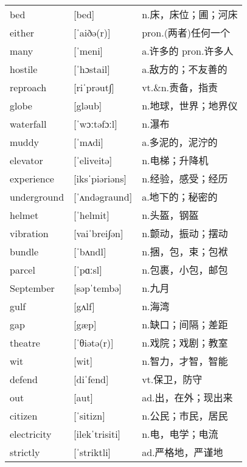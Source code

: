 \documentclass[a4paper]{article}
\begin{document}
\section{}
\begin{tabular}{l l l}

bed & [bed] & n.床，床位；圃；河床 \\
either & [ˈaiðə(r)] & pron.(两者)任何一个 \\
many & [ˈmeni] & a.许多的 pron.许多人 \\
hostile & [ˈhɔstail] & a.敌方的；不友善的 \\
reproach & [riˈprəut∫] & vt.\&n.责备，指责 \\
globe & [gləub] & n.地球，世界；地界仪 \\
waterfall & [ˈwɔːtəfɔːl] & n.瀑布 \\
muddy & [ˈmʌdi] & a.多泥的，泥泞的 \\
elevator & [ˈeliveitə] & n.电梯；升降机 \\
experience & [iksˈpiəriəns] & n.经验，感受；经历 \\
underground & [ˈʌndəgraund] & a.地下的；秘密的 \\
helmet & [ˈhelmit] & n.头盔，钢盔 \\
vibration & [vaiˈbrei∫ən] & n.颤动，振动；摆动 \\
bundle & [ˈbʌndl] & n.捆，包，束；包袱 \\
parcel & [ˈpɑːsl] & n.包裹，小包，邮包 \\
September & [səpˈtembə] & n.九月 \\
gulf & [gʌlf] & n.海湾 \\
gap & [gæp] & n.缺口；间隔；差距 \\
theatre & [ˈθiətə(r)] & n.戏院；戏剧；教室 \\
wit & [wit] & n.智力，才智，智能 \\
defend & [diˈfend] & vt.保卫，防守 \\
out & [aut] & ad.出，在外；现出来 \\
citizen & [ˈsitizn] & n.公民；市民，居民 \\
electricity & [ilekˈtrisiti] & n.电，电学；电流 \\
strictly & [ˈstriktli] & ad.严格地，严谨地 \\

\end{tabular}
\end{document}
